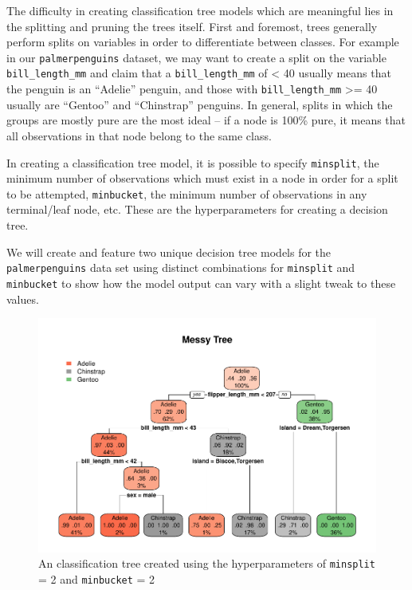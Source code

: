 \documentclass[12pt]{article}
\begin{document}
The difficulty in creating classification tree models which are
meaningful lies in the splitting and pruning the trees itself. First and
foremost, trees generally perform splits on variables in order to
differentiate between classes. For example in our
\texttt{palmerpenguins} dataset, we may want to create a split on the
variable \texttt{bill\_length\_mm} and claim that a
\texttt{bill\_length\_mm} of \textless{} 40 usually means that the
penguin is an ``Adelie'' penguin, and those with
\texttt{bill\_length\_mm} \textgreater= 40 usually are ``Gentoo'' and
``Chinstrap'' penguins. In general, splits in which the groups are
mostly pure are the most ideal -- if a node is 100\% pure, it means that
all observations in that node belong to the same class.

In creating a classification tree model, it is possible to specify
\texttt{minsplit}, the minimum number of observations which must exist
in a node in order for a split to be attempted, \texttt{minbucket}, the
minimum number of observations in any terminal/leaf node, etc. These are
the hyperparameters for creating a decision tree.

We will create and feature two unique decision tree models for the
\texttt{palmerpenguins} data set using distinct combinations for
\texttt{minsplit} and \texttt{minbucket} to show how the model output
can vary with a slight tweak to these values.

\newpage

\begin{figure}
\centering
\includegraphics{report_files/figure-latex/tree1.1-1.pdf}
\caption{\label{fig:tree1.1} An classification tree created using the
hyperparameters of \texttt{minsplit} = 2 and \texttt{minbucket} = 2}
\end{figure}
\end{document}
